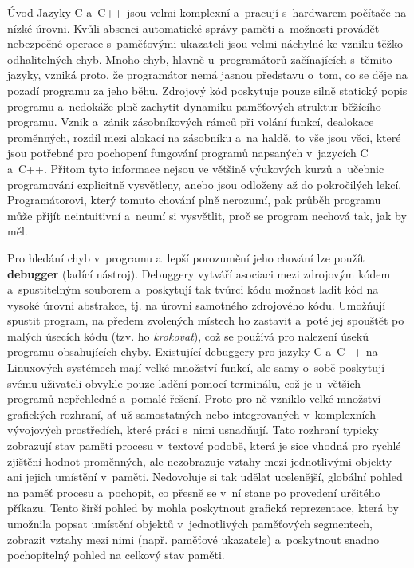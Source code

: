 \documentclass[czech,bachelor,male,python,dept460,hidelinks]{diploma}						%
\newcommand{\parspace}[1][]{
	\ifthenelse{\isempty{#1}}{\vspace{0mm}}{\vspace{#1}}
	\par
}
\begin{document}
\MakeTitlePages

\begin{section}{Úvod}
	Jazyky C a~C++ jsou velmi komplexní a~pracují s~hardwarem počítače na nízké úrovni.
	Kvůli absenci automatické správy paměti a~možnosti provádět nebezpečné operace s~paměťovými ukazateli jsou velmi náchylné ke vzniku těžko odhalitelných chyb.
	Mnoho chyb, hlavně u~programátorů začínajících s~těmito jazyky, vzniká proto, že programátor nemá jasnou představu o~tom, co se děje na pozadí programu za
	jeho běhu. Zdrojový kód poskytuje pouze silně statický popis programu a~nedokáže plně zachytit dynamiku paměťových struktur běžícího programu.
	Vznik a~zánik zásobníkových rámců při volání funkcí, dealokace proměnných, rozdíl mezi alokací na zásobníku a~na haldě,
	to vše jsou věci, které jsou potřebné pro pochopení fungování programů napsaných v~jazycích C a~C++. Přitom tyto informace nejsou ve většině výukových kurzů
	a~učebnic programování explicitně vysvětleny, anebo jsou odloženy až do pokročilých lekcí. Programátorovi, který tomuto chování plně nerozumí,
	pak průběh programu může přijít neintuitivní a~neumí si vysvětlit, proč se program nechová tak, jak by měl.
	
	\parspace Pro hledání chyb v~programu a~lepší porozumění jeho chování lze použít \textbf{debugger} (ladící nástroj).
	Debuggery vytváří asociaci mezi zdrojovým kódem a~spustitelným souborem a~poskytují tak tvůrci kódu možnost ladit kód
	na vysoké úrovni abstrakce, tj. na úrovni samotného zdrojového kódu. Umožňují spustit program, na předem zvolených místech ho zastavit a~poté jej spouštět
	po malých úsecích kódu (tzv. ho \textit{krokovat}), což se používá pro nalezení úseků programu obsahujících chyby. Existující debuggery pro jazyky C a~C++ na
	Linuxových systémech mají velké množství funkcí, ale samy o~sobě poskytují svému uživateli obvykle pouze ladění pomocí terminálu, což je u~větších programů
	nepřehledné a~pomalé řešení. Proto pro ně vzniklo velké množství grafických rozhraní, ať už samostatných nebo integrovaných v~komplexních vývojových prostředích,
	které práci s~nimi usnadňují. Tato rozhraní typicky zobrazují stav paměti procesu v~textové podobě, která je sice vhodná pro rychlé
	zjištění hodnot proměnných, ale nezobrazuje vztahy mezi jednotlivými objekty ani jejich umístění v~paměti.
	Nedovoluje si tak udělat ucelenější, globální pohled na paměť procesu a~pochopit, co přesně se v~ní stane po provedení určitého příkazu.
	Tento širší pohled by mohla poskytnout grafická reprezentace, která by umožnila popsat umístění objektů v~jednotlivých paměťových segmentech,
	zobrazit vztahy mezi nimi (např. paměťové ukazatele) a~poskytnout snadno pochopitelný pohled na celkový stav paměti.
	

\end{section}
\end{document}
